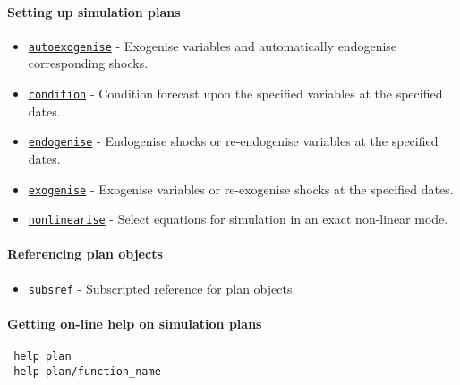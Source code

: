  \paragraph{Setting up simulation plans}
 
 \begin{itemize}
 \item
   \href{plan/autoexogenise}{\texttt{autoexogenise}} - Exogenise
   variables and automatically endogenise corresponding shocks.
 \item
   \href{plan/condition}{\texttt{condition}} - Condition forecast upon
   the specified variables at the specified dates.
 \item
   \href{plan/endogenise}{\texttt{endogenise}} - Endogenise shocks or
   re-endogenise variables at the specified dates.
 \item
   \href{plan/exogenise}{\texttt{exogenise}} - Exogenise variables or
   re-exogenise shocks at the specified dates.
 \item
   \href{plan/nonlinearise}{\texttt{nonlinearise}} - Select equations for
   simulation in an exact non-linear mode.
 \end{itemize}
 
 \paragraph{Referencing plan objects}
 
 \begin{itemize}
 \item
   \href{plan/subsref}{\texttt{subsref}} - Subscripted reference for plan
   objects.
 \end{itemize}
 
 \paragraph{Getting on-line help on simulation plans}
 
 \begin{verbatim}
 help plan
 help plan/function_name
 \end{verbatim}



